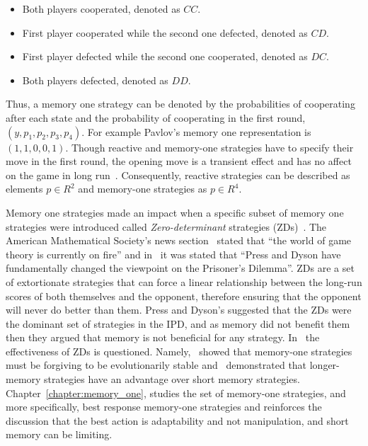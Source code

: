\begin{itemize}
    \item Both players cooperated, denoted as \(CC\).
    \item First player cooperated while the second one defected, denoted as \(CD\).
    \item First player defected while the second one cooperated, denoted as \(DC\).
    \item Both players defected, denoted as \(DD\).
\end{itemize}

Thus, a memory one strategy can be denoted by the probabilities of cooperating
after each state and the probability of cooperating in the first round, \((y,
p_1, p_2, p_3, p_4)\). For example Pavlov's memory one representation is \((1,
1, 0, 0, 1)\). Though reactive and memory-one strategies have to specify their
move in the first round, the opening move is a transient effect and has no affect
on the game in long run~\cite{sigmund2010calculus}. Consequently, reactive strategies
can be described as elements \(p \in R^2\) and memory-one strategies as \(p \in R^4\).

Memory one strategies made an impact when a specific subset of memory one
strategies were introduced called \textit{Zero-determinant} strategies
(ZDs)~\cite{Press2012}. The American Mathematical Society's news section~\cite{Hilbe2015}
stated that ``the world of game theory is currently on fire'' and in~\cite{Stewart2012}
it was stated that
``Press and Dyson have fundamentally changed the viewpoint on the Prisoner's Dilemma''.
ZDs are a set of
extortionate strategies that can force a linear relationship between
the long-run scores of both themselves and the opponent, therefore ensuring that the
opponent will never do better than them. Press and Dyson's suggested that the ZDs
were the dominant set of strategies in the
IPD, and as memory did not benefit them then they argued that memory is not beneficial for any strategy. In~\cite{Adami2013, Knight2017,
Hilbe2013, Hilbe2013b, Hilbe2015, KnightHGC17, Knight2019, Lee2015, Stewart2012} the
effectiveness of ZDs is questioned. Namely,~\cite{Stewart2013, Stewart2016}
showed that memory-one strategies must be forgiving to be evolutionarily stable
and~\cite{Knight2017, Hilbe2017, KnightHGC17, Knight2019, Lee2015, Pan2015} demonstrated
that longer-memory strategies have an advantage over short memory
strategies. Chapter~\ref{chapter:memory_one}, studies the set of memory-one strategies,
and more specifically, best response memory-one strategies and reinforces the
discussion that the best action is adaptability and not manipulation, and short
 memory can be limiting.

